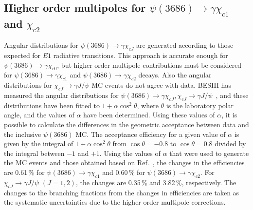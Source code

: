 \documentclass[aps,prd,twocolumn,showpacs,floatfix,byrevtex]{revtex4-1}
\begin{document}
\subsection{\boldmath Higher order multipoles for $\psi(3686) \to \gamma
  \chi_{c1}$ and $\chi_{c2}$}
\label{higher}

Angular distributions for $\psi(3686) \to \gamma \chi_{cJ}$ are
generated according to those expected for $E1$ radiative transitions.
This approach is accurate enough for $\psi(3686) \to \gamma
\chi_{c0}$, but higher order multipole contributions must be
considered for $\psi(3686) \to \gamma \chi_{c1}$ and $\psi(3686) \to
\gamma \chi_{c2}$ decays. Also the angular distributions for
$\chi_{cJ} \to \gamma J/\psi$ MC events do not agree with data.
BESIII has measured the angular distributions for $\psi(3686) \to
\gamma \chi_{cJ}, \chi_{cJ} \to \gamma J/\psi$~\cite{bam158}, and
these distributions have been fitted to $1 + \alpha \cos^2 \theta$,
where $\theta$ is the laboratory polar angle, and the values of
$\alpha$ have been determined.  Using these values of $\alpha$, it is
possible to calculate the differences in the geometric acceptance
between data and the inclusive $\psi(3686)$ MC.  The acceptance
efficiency for a given value of $\alpha$ is given by the integral of
$1 + \alpha\cos^2 \theta$ from $\cos \theta = -0.8$ to $\cos \theta =
0.8$ divided by the integral between $-1$ and $+1$.
Using the values of $\alpha$ that were used to generate the MC events
and those obtained based on Ref.~\cite{bam158}, the changes in the
efficiencies are 0.61\,\% for $\psi(3686) \to \gamma \chi_{c1}$ and
0.60\,\% for $\psi(3686) \to \gamma \chi_{c2}$.  For $\chi_{cJ} \to
\gamma J/\psi$ $(J = 1,2)$, the changes are 0.35\,\% and 3.82\,\%,
respectively.  The changes to the branching fractions from the changes
in efficiencies are taken as the systematic uncertainties due to the
higher order multipole corrections.
\end{document}

